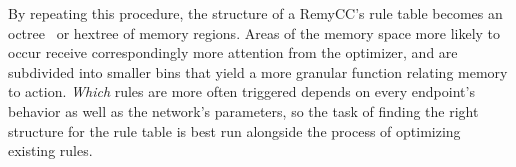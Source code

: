 By repeating this procedure, the structure of a RemyCC's rule table
becomes an octree~\cite{octree} or hextree of memory regions. Areas of
the memory space more likely to occur receive correspondingly more
attention from the optimizer, and are subdivided into smaller bins
that yield a more granular function relating memory to
action. \emph{Which} rules are more often triggered depends on every
endpoint's behavior as well as the network's parameters, so the task
of finding the right structure for the rule table is best run
alongside the process of optimizing existing rules.

